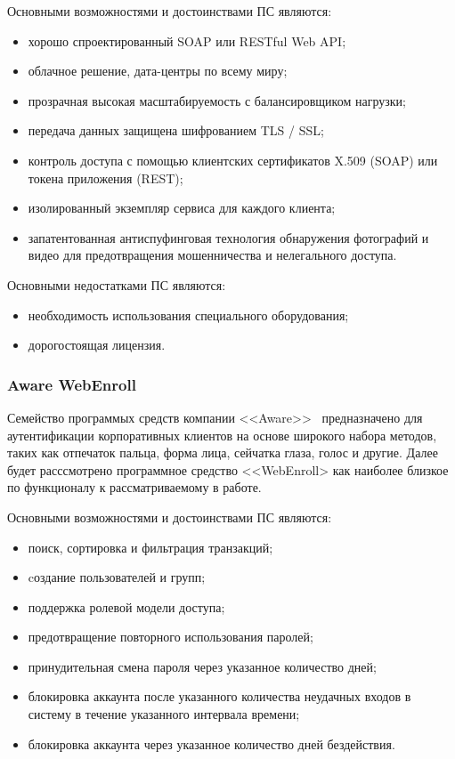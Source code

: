 Основными возможностями и достоинствами ПС являются:
\begin{itemize}
  \item хорошо спроектированный SOAP или RESTful Web API;
  \item облачное решение, дата-центры по всему миру;
  \item прозрачная высокая масштабируемость с балансировщиком нагрузки;
  \item передача данных защищена шифрованием TLS / SSL;
  \item контроль доступа с помощью клиентских сертификатов X.509 (SOAP) или токена приложения (REST);
  \item изолированный экземпляр сервиса для каждого клиента;
  \item запатентованная антиспуфинговая технология обнаружения фотографий и видео для предотвращения мошенничества и нелегального доступа.
\end{itemize}

Основными недостатками ПС являются:
\begin{itemize}
  \item необходимость использования специального оборудования;
  \item дорогостоящая лицензия.
\end{itemize}

\subsubsection{Aware WebEnroll}
\label{sub:domain:analogs:aware}
Семейство программых средств компании <<Aware>>~\cite{analogs_aware} предназначено для аутентификации корпоративных клиентов на основе широкого набора методов, таких как отпечаток пальца, форма лица, сейчатка глаза, голос и другие. Далее будет расссмотрено программное средство <<WebEnroll> как наиболее близкое по функционалу к рассматриваемому в работе.

Основными возможностями и достоинствами ПС являются:
\begin{itemize}
    \item поиск, сортировка и фильтрация транзакций;
    \item cоздание пользователей и групп;
    \item поддержка ролевой модели доступа;
    \item предотвращение повторного использования паролей;
    \item принудительная смена пароля через указанное количество дней;
    \item блокировка аккаунта после указанного количества неудачных входов в систему в течение указанного интервала времени;
    \item блокировка аккаунта через указанное количество дней бездействия.
\end{itemize}

